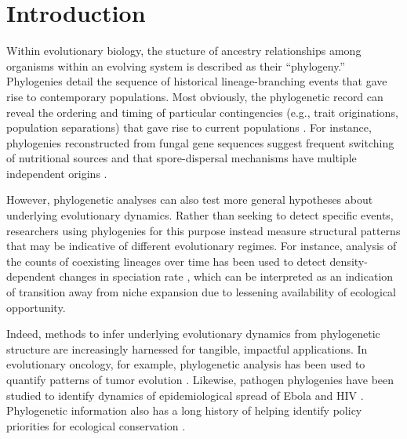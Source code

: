 \section{Introduction}
\label{sec:introduction}

Within evolutionary biology, the stucture of ancestry relationships among organisms within an evolving system is described as their ``phylogeny.''
Phylogenies detail the sequence of historical lineage-branching events that gave rise to contemporary populations.
Most obviously, the phylogenetic record can reveal the ordering and timing of particular contingencies (e.g., trait originations, population separations) that gave rise to current populations \citep{pagel1999inferring,arbogast2002estimating}.
For instance, phylogenies reconstructed from fungal gene sequences suggest frequent switching of nutritional sources and that spore-dispersal mechanisms have multiple independent origins \citep{james2006reconstructing}.

However, phylogenetic analyses can also test more general hypotheses about underlying evolutionary dynamics.
Rather than seeking to detect specific events, researchers using phylogenies for this purpose instead measure structural patterns that may be indicative of different evolutionary regimes.
For instance, analysis of the counts of coexisting lineages over time has been used to detect density-dependent changes in speciation rate \citep{rabosky2008density}, which can be interpreted as an indication of transition away from niche expansion due to lessening availability of ecological opportunity.

Indeed, methods to infer underlying evolutionary dynamics from phylogenetic structure are increasingly harnessed for tangible, impactful applications.
In evolutionary oncology, for example, phylogenetic analysis has been used to quantify patterns of tumor evolution \citep{scottInferringTumorProliferative2020,lewinsohnStatedependentEvolutionaryModels2023}.
Likewise, pathogen phylogenies have been studied to identify dynamics of epidemiological spread of Ebola and HIV \citep{giardina2017inference,saulnier2017inferring,voznica2022deep}.
Phylogenetic information also has a long history of helping identify policy priorities for ecological conservation \citep{forestPreservingEvolutionaryPotential2007}.


